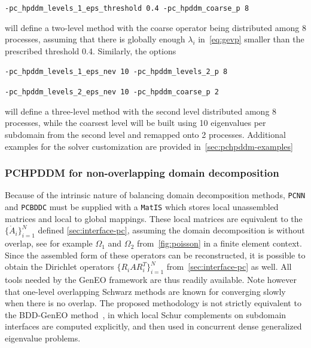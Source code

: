 \documentclass[3p,11pt]{elsarticle}
\newcommand{\pk}[1]{\texttt{#1}}
\begin{document}
\pk{-pc\_hpddm\_levels\_1\_eps\_threshold 0.4 -pc\_hpddm\_coarse\_p 8}

\noindent will define a two-level method with the coarse operator being distributed
among 8 processes, assuming that there is globally enough $\lambda_i$ in~\cref{eq:gevp} smaller than the prescribed threshold 0.4.
Similarly, the options

\pk{-pc\_hpddm\_levels\_1\_eps\_nev 10 -pc\_hpddm\_levels\_2\_p 8}

\pk{-pc\_hpddm\_levels\_2\_eps\_nev 10 -pc\_hpddm\_coarse\_p 2}

\noindent will define
a three-level method with the second level distributed among 8 processes, while the coarsest level
will be built using 10 eigenvalues per subdomain from the second level and remapped onto 2 processes.
Additional examples for the solver customization are provided in~\cref{sec:pchpddm-examples}

    \subsubsection{PCHPDDM for non-overlapping domain decomposition}
Because of the intrinsic nature of balancing domain
decomposition methods, \pk{PCNN} and \pk{PCBDDC} must be supplied with a \pk{MatIS}
which stores local unassembled matrices and local to global mappings.
These local matrices are equivalent to the $\{\mathring{A}_i\}_{i=1}^N$
defined \cref{sec:interface-pc}, assuming the domain decomposition is without
overlap, see for example $\Omega_1$ and $\Omega_2$ from~\cref{fig:poisson} in a
finite element context. Since the assembled form of these operators can be reconstructed,
it is possible to obtain the Dirichlet operators
$\{R_i A R_i^T\}_{i=1}^N$ from~\cref{sec:interface-pc} as well. All tools needed by the
GenEO framework are thus readily available. Note however that one-level
overlapping Schwarz methods are known for converging slowly when there is
no overlap. The proposed methodology is not strictly equivalent to the
BDD-GenEO method~\cite{spillane2013automatic}, in which local Schur complements
on subdomain interfaces are computed explicitly, and then used in concurrent
dense generalized eigenvalue problems.
\end{document}
